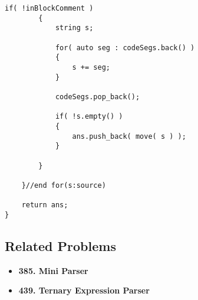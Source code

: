 \begin{lstlisting}[style=customc, caption={Parse}]
        if( !inBlockComment )
        {
            string s;

            for( auto seg : codeSegs.back() )
            {
                s += seg;
            }

            codeSegs.pop_back();

            if( !s.empty() )
            {
                ans.push_back( move( s ) );
            }

        }

    }//end for(s:source)

    return ans;
}
\end{lstlisting}

\subsection{Related Problems}
\begin{itemize}
\item \textbf{385. Mini Parser}
\item \textbf{439. Ternary Expression Parser}
\end{itemize}